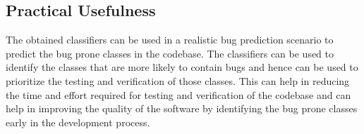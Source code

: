 \documentclass{article}
\newcommand\templateInstruction[1]{
\hl{#1}
}
\begin{document}
\subsection{Practical Usefulness}
The obtained classifiers can be used in a realistic bug prediction scenario to predict the bug prone classes in the codebase. The classifiers can be used to identify the classes that are more likely to contain bugs and hence can be used to prioritize the testing and verification of those classes. 
This can help in reducing the time and effort required for testing and verification of the codebase and can help in improving the quality of the software by identifying the bug prone classes early in the development process.
\end{document}
